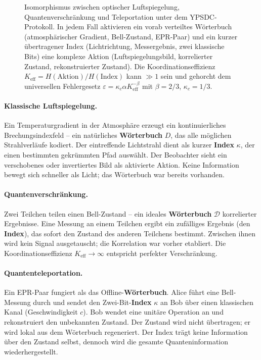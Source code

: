 \documentclass[12pt,a4paper]{article}
\theoremstyle{remark}
\begin{document}
\begin{figure}[htbp]
{%
		}
		\caption{Isomorphismus zwischen optischer Luftspiegelung, Quantenverschränkung und Teleportation unter dem YPSDC-Protokoll. In jedem Fall aktivieren ein vorab verteiltes Wörterbuch (atmosphärischer Gradient, Bell-Zustand, EPR-Paar) und ein kurzer übertragener Index (Lichtrichtung, Messergebnis, zwei klassische Bits) eine komplexe Aktion (Luftspiegelungsbild, korrelierter Zustand, rekonstruierter Zustand). Die Koordinationseffizienz $K_{\mathrm{eff}} = H(\text{Aktion})/H(\text{Index})$ kann $\gg 1$ sein und gehorcht dem universellen Fehlergesetz $\varepsilon = \kappa_c \alpha K_{\mathrm{eff}}^{-\beta}$ mit $\beta=2/3$, $\kappa_c=1/3$.}
		\label{fig:mirage-ypsdc}
	\end{figure}
	
	\paragraph{Klassische Luftspiegelung.}
	Ein Temperaturgradient in der Atmosphäre erzeugt ein kontinuierliches Brechungsindexfeld – ein natürliches \textbf{Wörterbuch} $D$, das alle möglichen Strahlverläufe kodiert. Der eintreffende Lichtstrahl dient als kurzer \textbf{Index} $\kappa$, der einen bestimmten gekrümmten Pfad auswählt. Der Beobachter sieht ein verschobenes oder invertiertes Bild als aktivierte Aktion. Keine Information bewegt sich schneller als Licht; das Wörterbuch war bereits vorhanden.
	
	\paragraph{Quantenverschränkung.}
	Zwei Teilchen teilen einen Bell-Zustand – ein ideales \textbf{Wörterbuch} $\mathcal{D}$ korrelierter Ergebnisse. Eine Messung an einem Teilchen ergibt ein zufälliges Ergebnis (den \textbf{Index}), das sofort den Zustand des anderen Teilchens bestimmt. Zwischen ihnen wird kein Signal ausgetauscht; die Korrelation war vorher etabliert. Die Koordinationseffizienz $K_{\mathrm{eff}} \to \infty$ entspricht perfekter Verschränkung.
	
	\paragraph{Quantenteleportation.}
	Ein EPR-Paar fungiert als das Offline-\textbf{Wörterbuch}. Alice führt eine Bell-Messung durch und sendet den Zwei-Bit-\textbf{Index} $\kappa$ an Bob über einen klassischen Kanal (Geschwindigkeit $c$). Bob wendet eine unitäre Operation an und rekonstruiert den unbekannten Zustand. Der Zustand wird nicht übertragen; er wird lokal aus dem Wörterbuch regeneriert. Der Index trägt keine Information über den Zustand selbst, dennoch wird die gesamte Quanteninformation wiederhergestellt.
	
\end{document}

